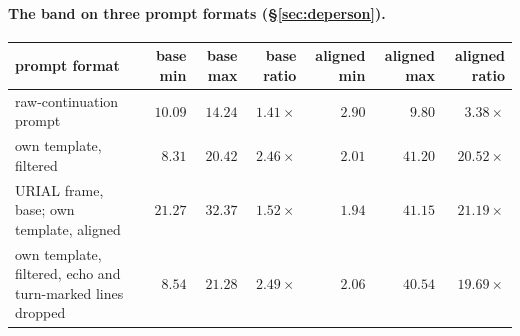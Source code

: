 \paragraph*{The band on three prompt formats (\S\ref{sec:deperson}).}
\begin{center}\scriptsize\setlength{\tabcolsep}{4pt}
\begin{tabular}{lrrrrrr}\toprule
prompt format & base min & base max & base ratio & aligned min & aligned max & aligned ratio \\ \midrule
raw-continuation prompt & $10.09$ & $14.24$ & $1.41\times$ & $2.90$ & $9.80$ & $3.38\times$ \\
own template, filtered & $8.31$ & $20.42$ & $2.46\times$ & $2.01$ & $41.20$ & $20.52\times$ \\
URIAL frame, base; own template, aligned & $21.27$ & $32.37$ & $1.52\times$ & $1.94$ & $41.15$ & $21.19\times$ \\
own template, filtered, echo and turn-marked lines dropped & $8.54$ & $21.28$ & $2.49\times$ & $2.06$ & $40.54$ & $19.69\times$ \\
\bottomrule\end{tabular}\end{center}
